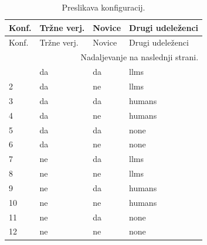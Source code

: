 \small
\setlength{\LTleft}{0pt}
\setlength{\LTright}{0pt}
\begin{longtable}{llll}
\caption{Preslikava konfiguracij.}\label{tab:configurations}\\
\toprule
Konf. & Tržne verj. & Novice & Drugi udeleženci \\
\midrule
\endfirsthead
\toprule
Konf. & Tržne verj. & Novice & Drugi udeleženci \\
\midrule
\endhead
\midrule
\multicolumn{4}{r}{Nadaljevanje na naslednji strani.} \\
\endfoot
\bottomrule
\endlastfoot
1 & da & da & llms \\
2 & da & ne & llms \\
3 & da & da & humans \\
4 & da & ne & humans \\
5 & da & da & none \\
6 & da & ne & none \\
7 & ne & da & llms \\
8 & ne & ne & llms \\
9 & ne & da & humans \\
10 & ne & ne & humans \\
11 & ne & da & none \\
12 & ne & ne & none \\
\end{longtable}
\normalsize
